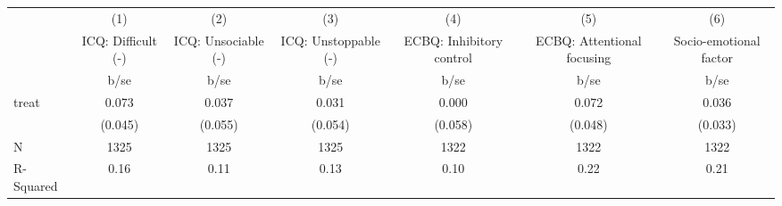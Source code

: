 {
\def\sym#1{\ifmmode^{#1}\else\(^{#1}\)\fi}
\begin{tabular}{l*{6}{c}}
\hline\hline
                    &\multicolumn{1}{c}{(1)}&\multicolumn{1}{c}{(2)}&\multicolumn{1}{c}{(3)}&\multicolumn{1}{c}{(4)}&\multicolumn{1}{c}{(5)}&\multicolumn{1}{c}{(6)}\\
                    &\multicolumn{1}{c}{ICQ: Difficult (-)}&\multicolumn{1}{c}{ICQ: Unsociable (-)}&\multicolumn{1}{c}{ICQ: Unstoppable (-)}&\multicolumn{1}{c}{ECBQ: Inhibitory control}&\multicolumn{1}{c}{ECBQ: Attentional focusing}&\multicolumn{1}{c}{Socio-emotional factor}\\
                    &        b/se         &        b/se         &        b/se         &        b/se         &        b/se         &        b/se         \\
\hline
treat               &       0.073         &       0.037         &       0.031         &       0.000         &       0.072         &       0.036         \\
                    &     (0.045)         &     (0.055)         &     (0.054)         &     (0.058)         &     (0.048)         &     (0.033)         \\
\hline
N                   &        1325         &        1325         &        1325         &        1322         &        1322         &        1322         \\
R-Squared           &        0.16         &        0.11         &        0.13         &        0.10         &        0.22         &        0.21         \\
\hline\hline
\end{tabular}
}
